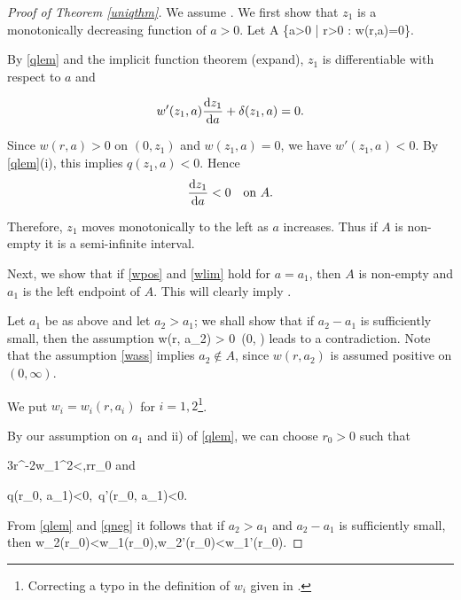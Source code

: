 \begin{proof}[Proof of Theorem \ref{uniqthm}]
    We assume .  We first show that $z_1$ is a monotonically
    decreasing function of $a>0$. 
    Let
    \be\label{adef}
    A \coloneqq \left\{\;a>0 \;\middle|\; \exists r>0 \;:\; w(r,a)=0\;\right\}.
    \ee

    By \cref{qlem} and the implicit function theorem ({\red expand}), $z_1$ is
    differentiable with respect to $a$ and

    $$w'(z_1, a)\frac{\mathop{}\!\mathrm{d} z_1}{\mathop{}\!\mathrm{d} a} + \delta(z_1, a) = 0.$$

    Since $w(r, a)>0$ on $(0, z_1)$ and $w(z_1, a)=0$, we have $w'(z_1, a)<0$. 
    By \cref{qlem}(i), this implies $q(z_1, a)<0$.  Hence 
    $$\dfrac{\mathop{}\!\mathrm{d} z_1}{\mathop{}\!\mathrm{d} a}<0\quad\text{on}~A.$$ 

    Therefore, $z_1$ moves monotonically to the left as $a$ increases. 
    Thus if $A$ is non-empty it is a semi-infinite interval. 
   
    Next, we show that if \eqref{wpos} and \eqref{wlim} hold for $a=a_1$, then
    $A$ is non-empty and $a_1$ is the left endpoint of $A$. This will clearly
    imply .
   
    Let $a_1$ be as above and let $a_2>a_1$; we shall show that if $a_2-a_1$ is
    sufficiently small, then the assumption 
    \be\label{wass} w(r, a_2) > 0\quad{}~(0, \infty)\ee 
    leads to a contradiction. Note that the assumption \eqref{wass} implies  
    $a_2\not\in A$, since $w(r, a_2)$ is assumed positive on $(0, \infty)$.

    We put $w_i=w_i(r, a_i)$ for $i=1, 2$\footnote{Correcting a typo in
    the definition of $w_i$ given in \cite{coffm}.}. 

    By our assumption on $a_1$ and ii) of \cref{qlem}, we can choose $r_0>0$
    such that

    \be\label{ubw1} 3r^{-2}w_1^2<,\quad r\geq r_0\ee
    and

    \be\label{qneg} q(r_0, a_1)<0,\quad{}~q'(r_0, a_1)<0.\ee

    From \cref{qlem} and \eqref{qneg} it follows that if $a_2>a_1$ and $a_2-a_1$
    is sufficiently small, then
    \be\label{w2ltw1} w_2(r_0)<w_1(r_0),\quad w_2'(r_0)<w_1'(r_0).\ee


\end{proof}

